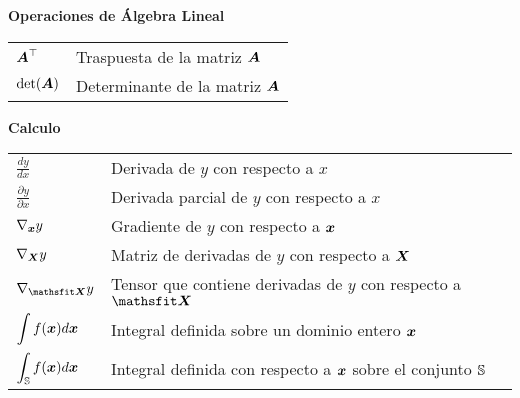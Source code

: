 \vspace{\notationgap}
\begin{minipage}{\textwidth}
\centerline{\bf Operaciones de Álgebra Lineal}
\bgroup
\def\arraystretch{1.5}
\begin{tabular}{>{\centering}m{} p{}}
$\displaystyle {\bm{A}}^\top$ & Traspuesta de la matriz ${\bm{A}}$ \\
$\displaystyle \mathrm{det}({\bm{A}})$ & Determinante de la matriz ${\bm{A}}$ \\
\end{tabular}
\egroup
{}
\end{minipage}

\vspace{\notationgap}
\begin{minipage}{\textwidth}
\centerline{\bf Calculo}
\bgroup
\def\arraystretch{1.5}
\begin{tabular}{>{\centering}m{} p{}}
$\displaystyle\frac{d y} {d x}$ & Derivada de $y$ con respecto a  $x$\\ [2ex]
$\displaystyle \frac{\partial y} {\partial x} $ & Derivada parcial de $y$ con respecto a $x$ \\
$\displaystyle \nabla_{\bm{x}} y $ & Gradiente de $y$ con respecto a ${\bm{x}}$ \\
$\displaystyle \nabla_{\bm{X}} y $ & Matriz de derivadas de $y$ con respecto a ${\bm{X}}$ \\
$\displaystyle \nabla_\tX y $ & Tensor que contiene derivadas de $y$ con respecto a $\tX$ \\
$\displaystyle \int f({\bm{x}}) d{\bm{x}} $ & Integral definida sobre un dominio entero ${\bm{x}}$ \\
$\displaystyle \int_{\mathbb{S}} f({\bm{x}}) d{\bm{x}}$ & Integral definida con respecto a ${\bm{x}}$ sobre el conjunto ${\mathbb{S}}$ \\
\end{tabular}
\egroup
{}
\end{minipage}


